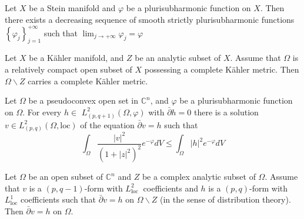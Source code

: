 \documentclass[lang=en,12pt,twoside]{textbook}
\begin{document}


\begin{lemma}
  Let $X$ be a Stein manifold and $\varphi$ be a plurisubharmonic function on $X$. Then there exists a decreasing sequence of smooth strictly plurisubharmonic functions $\left\{\varphi_j\right\}_{j=1}^{+\infty}$ such that $\lim _{j \rightarrow+\infty} \varphi_j=\varphi$
\end{lemma}

\begin{lemma}\label{lem:3.5}
  Let $X$ be a Kähler manifold, and $Z$ be an analytic subset of $X$. Assume that $\Omega$ is a relatively compact open subset of $X$ possessing a complete Kähler metric. Then $\Omega \backslash Z$ carries a complete Kähler metric.
\end{lemma}

\begin{lemma}
  Let $\Omega$ be a pseudoconvex open set in $\mathbb{C}^n$, and $\varphi$ be a plurisubharmonic function on $\Omega$. For every $h \in$ $L_{(p, q+1)}^2(\Omega, \varphi)$ with $\bar{\partial} h=0$ there is a solution $v \in L_{(p, q)}^2(\Omega, \textrm{loc} )$ of the equation $\bar{\partial} v=h$ such that
$$
\int_{\Omega} \frac{|v|^2}{\left(1+|z|^2\right)^2} e^{-\varphi} d V \leq \int_{\Omega}|h|^2 e^{-\varphi} d V
$$
\end{lemma}

\begin{lemma}\label{lem:6}
  Let $\Omega$ be an open subset of $\mathbb{C}^n$ and $Z$ be a complex analytic subset of $\Omega$. Assume that $v$ is a $(p, q-1)$-form with $L_{\text {loc }}^2$ coefficients and $h$ is a $(p, q)$-form with $L_{\textrm{loc}}^1$ coefficients such that $\bar{\partial} v=h$ on $\Omega \backslash Z$ (in the sense of distribution theory). Then $\bar{\partial} v=h$ on $\Omega$.
\end{lemma}
\end{document}
